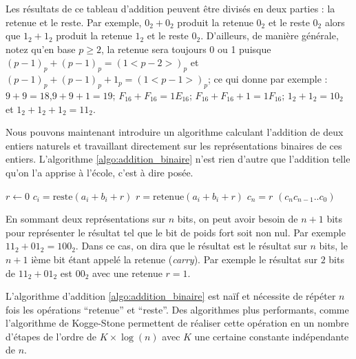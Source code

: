 Les résultats de ce tableau d'addition peuvent être divisés en deux parties : la retenue et le reste. Par exemple, $0_2 + 0_2$ produit la retenue $0_2$ et le reste $0_2$ alors que $1_2 + 1_2$ produit la retenue $1_2$ et le reste $0_2$. D'ailleurs, de manière générale, notez qu'en base $p\geq 2$, la retenue sera toujours 0 ou 1 puisque $(p-1)_p + (p-1)_p = (1<p-2>)_p$ et $(p-1)_p + (p-1)_p + 1_p = (1<p-1>)_p$; ce qui donne par exemple : $9 + 9 = 18$,$9+9+1=19$; $F_{16} + F_{16} = 1E_{16}$; $F_{16} + F_{16} + 1 = 1F_{16}$; $1_2 + 1_2 = 10_2$ et $1_2 + 1_2 + 1_2 = 11_2$.

Nous pouvons maintenant introduire un algorithme calculant l'addition de deux entiers naturels et travaillant directement sur les représentations binaires de ces entiers. L'algorithme \ref{algo:addition_binaire} n'est rien d'autre que l'addition telle qu'on l'a apprise à l'école, c'est à dire posée.

\begin{algorithm}
\caption{ \label{algo:addition_binaire}}
\begin{algorithmic}[1]
\State $r\gets 0$
\State $c_i = \text{reste}(a_i + b_i + r)$
\State $r = \text{retenue}(a_i + b_i + r)$
\EndFor
\State $c_n = r$
\State \Return $(c_n c_{n-1} .. c_ 0)$
\EndFunction
\end{algorithmic}
\end{algorithm}

En sommant deux représentations sur $n$ bits, on peut avoir besoin de $n+1$ bits pour représenter le résultat tel que le bit de poids fort soit non nul. Par exemple $11_2 + 01_2 = 100_2$. Dans ce cas, on dira que le résultat est le résultat sur $n$ bits, le $n+1$ ième bit étant appelé la retenue (\emph{carry}). Par exemple le résultat sur $2$ bits de $11_2 + 01_2$ est $00_2$ avec une retenue $r=1$.

L'algorithme d'addition \ref{algo:addition_binaire} est naïf et nécessite de répéter $n$ fois les opérations ``retenue'' et ``reste''. Des algorithmes plus performants, comme l'algorithme de Kogge-Stone permettent de réaliser cette opération en un nombre d'étapes de l'ordre de $K \times \log(n)$ avec $K$ une certaine constante indépendante de $n$.\\

